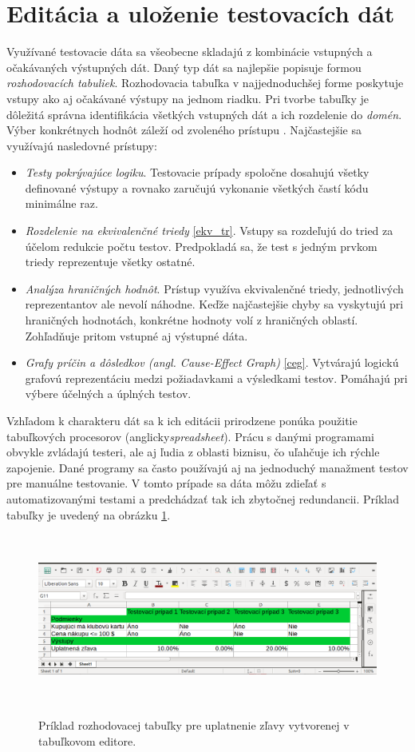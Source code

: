 \section{Editácia a uloženie testovacích dát}
Využívané testovacie dáta sa všeobecne skladajú z kombinácie vstupných a očakávaných výstupných dát. Daný typ dát sa najlepšie popisuje formou {\it rozhodovacích tabuliek}. Rozhodovacia tabuľka v najjednoduchšej forme poskytuje vstupy ako aj očakávané výstupy na jednom riadku. Pri tvorbe tabuľky je dôležitá správna identifikácia všetkých vstupných dát a ich rozdelenie do {\it domén}. Výber konkrétnych hodnôt záleží od zvoleného prístupu \cite{Ast}. Najčastejšie sa využívajú nasledovné prístupy:
\begin{itemize}
	\item{ \textit{Testy pokrývajúce logiku}. Testovacie prípady spoločne dosahujú všetky definované výstupy a rovnako zaručujú vykonanie všetkých častí kódu minimálne raz.}
	\item{ \textit{Rozdelenie na ekvivalenčné triedy} \ref{ekv_tr}. 
		Vstupy sa rozdeľujú  do tried za účelom redukcie počtu testov. Predpokladá sa, že test s jedným prvkom triedy reprezentuje všetky ostatné. }
	\item{ \textit{Analýza hraničných hodnôt}. 
		Prístup využíva ekvivalenčné triedy, jednotlivých reprezentantov ale nevolí náhodne. Keďže najčastejšie chyby sa vyskytujú pri hraničných hodnotách, konkrétne hodnoty volí z hraničných oblastí. Zohľadňuje pritom vstupné aj výstupné dáta.}
	\item{ \textit{Grafy príčin a dôsledkov (angl. Cause-Effect Graph)} \ref{ceg}. 
		Vytvárajú logickú grafovú reprezentáciu medzi požiadavkami a výsledkami testov. Pomáhajú pri výbere účelných a úplných testov.}
\end{itemize}


Vzhľadom k charakteru dát sa k ich editácii prirodzene ponúka použitie tabuľkových procesorov (anglicky{\it spreadsheet}). Prácu s danými programami obvykle zvládajú testeri, ale aj ľudia z oblasti biznisu, čo uľahčuje ich rýchle zapojenie. Dané programy sa často používajú aj na jednoduchý manažment testov pre manuálne testovanie. V tomto prípade sa dáta môžu zdieľať s automatizovanými testami a predchádzať tak ich zbytočnej redundancii. Príklad tabuľky je uvedený na obrázku \ref{Domtab_img}. 
\begin{figure}[h]\centering
	\centering
	\includegraphics[width=6.0in,height=2.2in]{obrazky-figures/decision_table.png}\\[1pt]
	\caption{Príklad rozhodovacej tabuľky pre uplatnenie zľavy vytvorenej v tabuľkovom editore.}
	\label{Domtab_img}
\end{figure}


